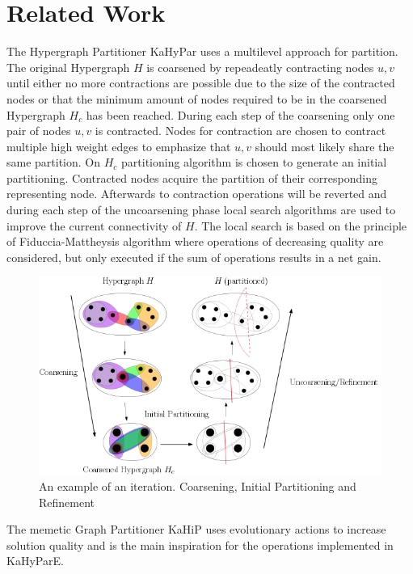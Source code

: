 \documentclass[a4paper,12pt,bibtotoc,titlepage, liststotoc,BCOR7mm,headsepline,pointlessnumbers]{scrbook}
\numberwithin{equation}{section}
\begin{document}
\chapter{Related Work}
The Hypergraph Partitioner KaHyPar uses a multilevel approach for partition. The original Hypergraph $H$ is coarsened by repeadeatly contracting nodes $u,v$ until either no more contractions are possible due to the size of the contracted nodes or that the minimum amount of nodes required to be in the coarsened Hypergraph $H_c$ has been reached. During each step of the coarsening only one pair of nodes $u, v$ is contracted. Nodes for contraction are chosen to contract multiple high weight edges to emphasize that $u,v$ should most likely share the same partition. 
On $H_c$ partitioning algorithm is chosen to generate an initial partitioning. Contracted nodes acquire the partition of their corresponding representing node.  Afterwards to contraction operations will be reverted and 
during each step of the uncoarsening phase local search algorithms are used to improve the current connectivity of $H$. The local search is based on the principle of
Fiduccia-Mattheysis algorithm where operations of decreasing quality are considered, but only executed if the sum of operations results in a net gain.
\newline
\begin{figure}[t!] 
    \vspace*{-.25cm}
  \centering
   \includegraphics[width=.8\textwidth]{Ipe/iteration.png}
  \caption{An example of an iteration. Coarsening, Initial Partitioning and Refinement}\label{fig:img.png}
    \vspace*{-.5cm}
\end{figure}

The memetic Graph Partitioner KaHiP uses evolutionary actions to increase solution quality and is the main inspiration for the operations implemented in KaHyParE.
\end{document}
